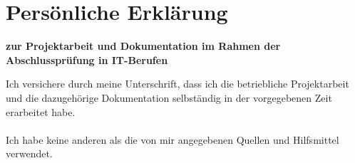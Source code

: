 \chapter{Pers\"onliche Erkl\"arung}

\textbf{zur Projektarbeit und Dokumentation im Rahmen der Abschlussprüfung in IT-Berufen}
	
\bigskip
	
\noindent
Ich versichere durch meine Unterschrift, dass ich die betriebliche Projektarbeit und die
dazugehörige Dokumentation selbständig in der vorgegebenen Zeit erarbeitet habe.\\
\\
Ich habe keine anderen als die von mir angegebenen Quellen und Hilfsmittel verwendet.
	
\vspace{4\baselineskip}

\noindent
	

